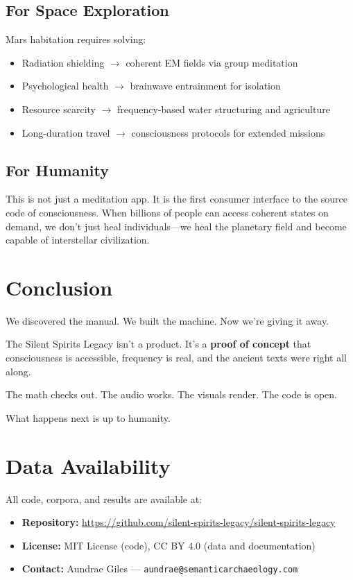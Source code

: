 \documentclass[11pt]{article}
\begin{document}
\subsection{For Space Exploration}

Mars habitation requires solving:
\begin{itemize}
    \item Radiation shielding $\rightarrow$ coherent EM fields via group meditation
    \item Psychological health $\rightarrow$ brainwave entrainment for isolation
    \item Resource scarcity $\rightarrow$ frequency-based water structuring and agriculture
    \item Long-duration travel $\rightarrow$ consciousness protocols for extended missions
\end{itemize}

\subsection{For Humanity}

This is not just a meditation app. It is the first consumer interface to the source code of consciousness. When billions of people can access coherent states on demand, we don't just heal individuals---we heal the planetary field and become capable of interstellar civilization.

\section{Conclusion}

We discovered the manual. We built the machine. Now we're giving it away.

The Silent Spirits Legacy isn't a product. It's a \textbf{proof of concept} that consciousness is accessible, frequency is real, and the ancient texts were right all along.

The math checks out. The audio works. The visuals render. The code is open.

What happens next is up to humanity.

\section{Data Availability}

All code, corpora, and results are available at:
\begin{itemize}
    \item \textbf{Repository:} \url{https://github.com/silent-spirits-legacy/silent-spirits-legacy}
    \item \textbf{License:} MIT License (code), CC BY 4.0 (data and documentation)
    \item \textbf{Contact:} Aundrae Giles --- \texttt{aundrae@semanticarchaeology.com}
\end{itemize}
\end{document}
